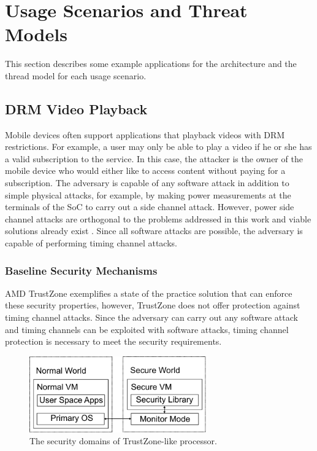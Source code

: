 \section{Usage Scenarios and Threat Models}

    This section describes some example applications for the architecture and 
    the thread model for each usage scenario.

    \subsection{DRM Video Playback}
    Mobile devices often support applications that playback videos with
    DRM restrictions. For example, a user may only be able to play a video if 
    he or she has a valid subscription to the service. In this case, the 
    attacker is the owner of the mobile device who would either like to access 
    content without paying for a subscription. The adversary is capable of any 
    software attack in addition to simple physical attacks, for example, by 
    making power measurements at the terminals of the SoC to carry out a side 
    channel attack. However, power side channel attacks are orthogonal to the 
    problems addressed in this work and viable solutions already exist 
    \cite{needed}. Since all software attacks are possible, the adversary is 
    capable of performing timing channel attacks. 

    \subsubsection{Baseline Security Mechanisms}
    AMD TrustZone \cite{trustzone} exemplifies a state of the practice solution 
    that can enforce these security properties, however, TrustZone does not 
    offer protection against timing channel attacks. Since the adversary can 
    carry out any software attack and timing channels can be exploited with 
    software attacks, timing channel protection is necessary to meet the 
    security requirements. 

    \begin{figure}
        \begin{center}
            \includegraphics[width=3in]{figs/worlds.pdf}
            \caption{The security domains of TrustZone-like processor.}
            \label{fig:tz_domains}
        \end{center}
    \end{figure}
    
